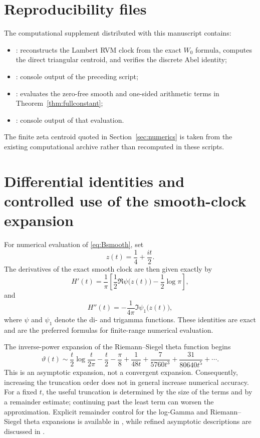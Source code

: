 \documentclass[11pt]{amsart}
\numberwithin{equation}{section}
\theoremstyle{definition}
\theoremstyle{remark}
\begin{document}
\section{Reproducibility files}\label{sec:reproducibility}
The computational supplement distributed with this manuscript contains:
\begin{itemize}[leftmargin=2em]
\item {}: reconstructs the Lambert RVM clock from the exact $W_0$ formula, computes the direct triangular centroid, and verifies the discrete Abel identity;
\item {}: console output of the preceding script;
\item {}: evaluates the zero-free smooth and one-sided arithmetic terms in Theorem~\ref{thm:fullconstant};
\item {}: console output of that evaluation.
\end{itemize}
The finite zeta centroid quoted in Section~\ref{sec:numerics} is taken from the existing computational archive rather than recomputed in these scripts.

\section{Differential identities and controlled use of the smooth-clock expansion}\label{sec:clock_differentials}
For numerical evaluation of \eqref{eq:Bsmooth}, set
\begin{equation}\label{eq:zt_clock}
z(t)=\frac14+\frac{it}{2}.
\end{equation}
The derivatives of the exact smooth clock are then given exactly by
\begin{equation}\label{eq:Hprime_exact}
H'(t)=\frac1\pi\left[
\frac12\Re\psi\bigl(z(t)\bigr)-\frac12\log\pi
\right],
\end{equation}
and
\begin{equation}\label{eq:Hsecond_exact}
H''(t)=-\frac1{4\pi}\Im\psi_1\bigl(z(t)\bigr),
\end{equation}
where $\psi$ and $\psi_1$ denote the di- and trigamma functions.  These identities are exact and are the preferred formulas for finite-range numerical evaluation.

The inverse-power expansion of the Riemann--Siegel theta function begins
\begin{equation}\label{eq:theta_asymptotic_full}
\vartheta(t)\sim
\frac t2\log\frac{t}{2\pi}-\frac t2-\frac\pi8
+\frac1{48t}+\frac7{5760t^3}+\frac{31}{80640t^5}+\cdots.
\end{equation}
This is an asymptotic expansion, not a convergent expansion.  Consequently, increasing the truncation order does not in general increase numerical accuracy.  For a fixed $t$, the useful truncation is determined by the size of the terms and by a remainder estimate; continuing past the least term can worsen the approximation.  Explicit remainder control for the log-Gamma and Riemann--Siegel theta expansions is available in \cite{Brent2018}, while refined asymptotic descriptions are discussed in \cite{Paris2020}.
\end{document}
